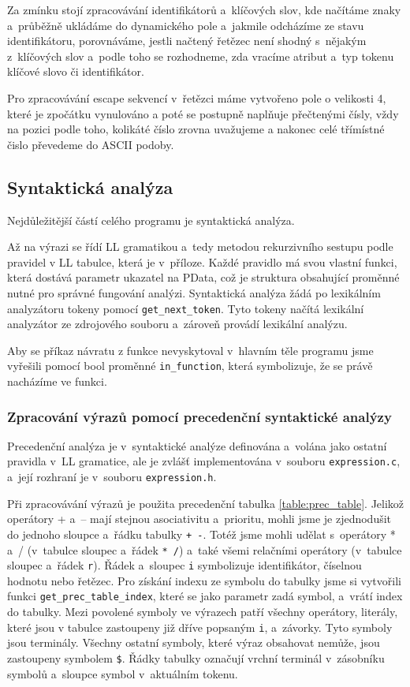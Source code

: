 \documentclass[a4paper, 11pt]{article}
\begin{document}
	Za zmínku stojí zpracovávání identifikátorů a~klíčových slov, kde načítáme znaky a~průběžně ukládáme do dynamického pole 
	a~jakmile odcházíme ze stavu identifikátoru, porovnáváme, jestli načtený řetězec není shodný s~nějakým z~klíčových slov a~podle 
	toho se rozhodneme, zda vracíme atribut a~typ tokenu klíčové slovo či identifikátor. 
	
	Pro zpracovávání escape sekvencí v~řetězci máme vytvořeno pole o velikosti 4, které je zpočátku vynulováno a poté se postupně 
	naplňuje přečtenými čísly, vždy na pozici podle toho, kolikáté číslo zrovna uvažujeme a nakonec celé třímístné čislo převedeme 
	do ASCII podoby.


	\subsection{Syntaktická analýza}

	Nejdůležitější částí celého programu je syntaktická analýza.

	Až na výrazi se řídí LL gramatikou a~tedy metodou rekurzivního sestupu podle pravidel v LL tabulce, která je v~příloze.	Každé pravidlo má svou vlastní funkci, která dostává parametr ukazatel na PData, což je struktura obsahující proměnné nutné pro správné fungování analýzi.
	Syntaktická analýza žádá po lexikálním analyzátoru tokeny pomocí \texttt{get\_next\_token}. Tyto tokeny načítá lexikální analyzátor ze zdrojového souboru a~zároveň provádí lexikální analýzu.
	
	Aby se příkaz návratu z funkce nevyskytoval v~hlavním těle programu jsme vyřešili pomocí bool proměnné \texttt{in\_function}, která symbolizuje, že se právě nacházíme ve funkci.

	\subsubsection{Zpracování výrazů pomocí precedenční syntaktické analýzy}

	Precedenční analýza je v~syntaktické analýze definována a~volána jako ostatní pravidla v~LL gramatice,
	ale je zvlášť implementována v~souboru \texttt{expression.c}, a~její rozhraní je v~souboru \texttt{expression.h}.

	Při zpracovávání výrazů je použita precedenční tabulka \ref{table:prec_table}. Jelikož operátory + a~– mají
	stejnou asociativitu a~prioritu, mohli jsme je zjednodušit do jednoho sloupce a~řádku tabulky \texttt{+ -}.
	Totéž jsme mohli udělat s~operátory * a~/ (v~tabulce sloupec a~řádek \texttt{* /}) a~také všemi relačními operátory
	(v~tabulce sloupec a~řádek \texttt{r}). Řádek a~sloupec \texttt{i} symbolizuje identifikátor, číselnou hodnotu
	nebo řetězec. Pro získání indexu ze symbolu do tabulky jsme si vytvořili funkci \texttt{get\_prec\_table\_index},
	které se jako parametr zadá symbol, a~vrátí index do tabulky. Mezi povolené symboly ve výrazech patří všechny
	operátory, literály, které jsou v tabulce zastoupeny již dříve popsaným \texttt{i}, a~závorky. Tyto symboly jsou
	terminály. Všechny ostatní symboly, které výraz obsahovat nemůže, jsou zastoupeny symbolem \texttt{\$}. Řádky
	tabulky označují vrchní terminál v~zásobníku symbolů a~sloupce symbol v~aktuálním tokenu.
\end{document}
